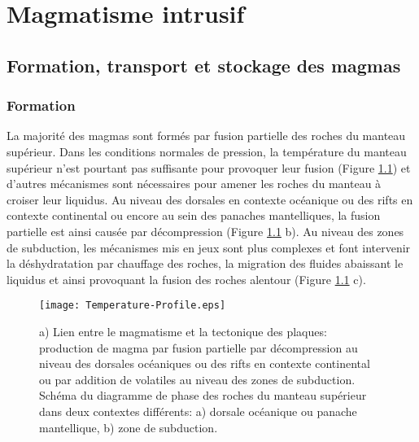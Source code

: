 \chapter{Magmatisme intrusif}
\label{chap1}
\minitoc

\section{Formation, transport et stockage des magmas}
\label{sec:magm-intr-un}

\subsection{Formation}
\label{sec:formation-1}

La majorité des magmas sont formés  par fusion partielle des roches du
manteau  supérieur.   Dans les  conditions  normales  de pression,  la
température du  manteau supérieur  n'est pourtant pas  suffisante pour
provoquer leur  fusion (Figure \ref{Geoterme}) et  d'autres mécanismes
sont  nécessaires pour  amener les  roches du  manteau à  croiser leur
liquidus.  Au niveau  des dorsales en contexte océanique  ou des rifts
en contexte continental  ou encore au sein  des panaches mantelliques,
la  fusion  partielle  est  ainsi  causée  par  décompression  (Figure
\ref{Geoterme} b).  Au niveau des  zones de subduction, les mécanismes
mis en jeux  sont plus complexes et font  intervenir la déshydratation
par  chauffage  des roches,  la  migration  des fluides  abaissant  le
liquidus et  ainsi provoquant  la fusion  des roches  alentour (Figure
\ref{Geoterme} c).

\begin{figure}[htpb]
  \begin{center}
    \graphicspath{ {/Users/thorey/Documents/These/Manuscript/Figure/Chapter1/} }
    \texttt{[image: Temperature-Profile.eps]}
    \caption{a) Lien entre le magmatisme et la tectonique des plaques:
      production de  magma par  fusion partielle par  décompression au
      niveau  des  dorsales  océaniques   ou  des  rifts  en  contexte
      continental ou par addition de  volatiles au niveau des zones de
      subduction. Schéma du  diagramme de phase des  roches du manteau
      supérieur dans  deux contextes différents: a)  dorsale océanique
      ou panache mantellique, b) zone de subduction.}
    \label{Geoterme}
  \end{center}
\end{figure}

